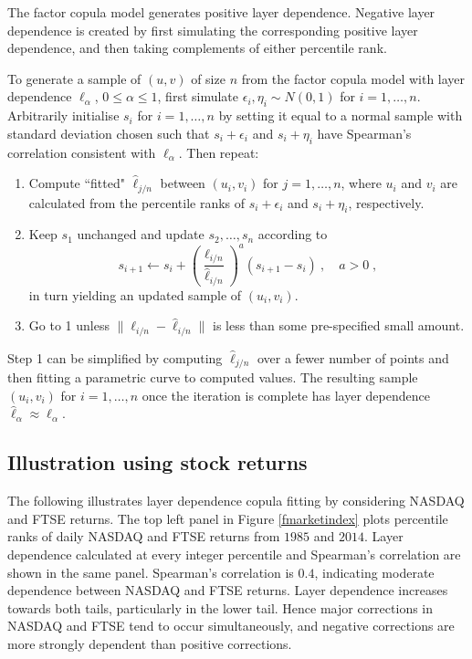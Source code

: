 \documentclass[authoryear]{elsarticle}
\newcommand{\eps}{\epsilon}
\newcommand{\cq}{\ ,\quad }
\newcommand{\fref}[1]{Figure \ref{#1}}
\begin{document}
The factor copula model generates positive layer dependence. Negative layer dependence is created by first simulating the corresponding positive layer dependence, and then taking complements of either percentile rank.

To generate a sample of $(u,v)$ of size $n$ from the factor copula model with layer dependence $\ell_\alpha$, $0\le\alpha\le 1$,  first simulate $\eps_i,\eta_i\sim N(0,1)$ for $i=1,\ldots,n$.  Arbitrarily initialise $s_i$ for $i=1,\ldots,n$ by setting it equal to a normal sample with standard deviation chosen such that $s_i+\eps_{i}$ and $s_i+\eta_{i}$ have Spearman's correlation consistent with $\ell_\alpha$. Then repeat:
\begin{enumerate}

\item Compute ``fitted"  $\hat\ell_{j/n}$ between  $(u_i,v_i)$ for $j=1,\ldots,n$, where $u_i$ and $v_i$ are calculated from the percentile ranks of $s_i+\eps_{i}$ and $s_i+\eta_{i}$, respectively.

\item Keep $s_1$ unchanged and update  $s_2,\ldots,s_n$ according to
$$
s_{i+1}  \leftarrow s_{i}+  \left(\frac{\ell_{i/n}}{\hat \ell_{i/n}}\right)^a(s_{i+1}-s_i)\cq a>0\;,
$$
in turn yielding an updated sample of $(u_i,v_i)$.

\item Go to 1 unless $\|\ell_{i/n} -  \hat\ell_{i/n} \|$ is less than some pre-specified small amount.

\end{enumerate}
Step 1 can be simplified by computing $\hat \ell_{j/n}$ over a fewer number of points and then fitting a parametric curve to computed values. The resulting sample $(u_i,v_i)$ for   $i=1,\ldots,n$ once the iteration is complete has  layer dependence $\hat\ell_\alpha\approx\ell_\alpha$.




\subsection{Illustration using stock returns}

The following illustrates layer dependence copula fitting by considering NASDAQ and FTSE returns. The top left panel in \fref{fmarketindex} plots percentile ranks of daily NASDAQ and FTSE returns from $1985$ and $2014$. Layer dependence calculated at every integer percentile and Spearman's correlation are shown in the same panel. Spearman's correlation is $0.4$, indicating moderate dependence between NASDAQ and FTSE returns. Layer dependence increases towards both tails, particularly in the lower tail. Hence major corrections in NASDAQ and FTSE tend to occur simultaneously, and negative corrections are more strongly dependent than positive corrections.
\end{document}
